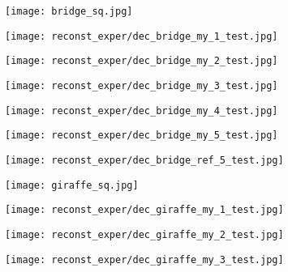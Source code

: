 \begin{figure}[H]
	\centering
	\begin{subfigure}[b]{0.13\linewidth}
		\texttt{[image: bridge\_sq.jpg]} %
	\end{subfigure}
	\begin{subfigure}[b]{0.13\linewidth}
		\texttt{[image: reconst\_exper/dec\_bridge\_my\_1\_test.jpg]} %
	\end{subfigure}
	\begin{subfigure}[b]{0.13\linewidth}
		\texttt{[image: reconst\_exper/dec\_bridge\_my\_2\_test.jpg]} %
	\end{subfigure}
	\begin{subfigure}[b]{0.13\linewidth}
		\texttt{[image: reconst\_exper/dec\_bridge\_my\_3\_test.jpg]} %
	\end{subfigure}
	\begin{subfigure}[b]{0.13\linewidth}
		\texttt{[image: reconst\_exper/dec\_bridge\_my\_4\_test.jpg]} %
	\end{subfigure}
	\begin{subfigure}[b]{0.13\linewidth}
		\texttt{[image: reconst\_exper/dec\_bridge\_my\_5\_test.jpg]} %
	\end{subfigure}
	\begin{subfigure}[b]{0.13\linewidth}
		\texttt{[image: reconst\_exper/dec\_bridge\_ref\_5\_test.jpg]} %
	\end{subfigure}
	\centering
	\begin{subfigure}[b]{0.13\linewidth}
		\texttt{[image: giraffe\_sq.jpg]} %
	\end{subfigure}
	\begin{subfigure}[b]{0.13\linewidth}
		\texttt{[image: reconst\_exper/dec\_giraffe\_my\_1\_test.jpg]} %
	\end{subfigure}
	\begin{subfigure}[b]{0.13\linewidth}
		\texttt{[image: reconst\_exper/dec\_giraffe\_my\_2\_test.jpg]} %
	\end{subfigure}
	\begin{subfigure}[b]{0.13\linewidth}
		\texttt{[image: reconst\_exper/dec\_giraffe\_my\_3\_test.jpg]} %

\end{subfigure}
\end{figure}
